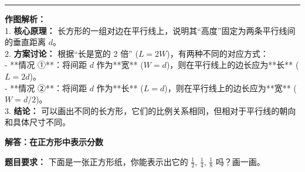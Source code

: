 \vspace{1.0cm}
\hrule
\vspace{0.4cm}

{\small
\textbf{作图解析：} \\
1. \textbf{核心原理：} 长方形的一组对边在平行线上，说明其“高度”固定为两条平行线间的垂直距离 $d$。 \\
2. \textbf{方案讨论：} 根据“长是宽的 2 倍” ($L = 2W$)，有两种不同的对应方式： \\
   - **情况 ①**：将间距 $d$ 作为**宽** ($W=d$)，则在平行线上的边长应为**长** ($L=2d$)。 \\
   - **情况 ②**：将间距 $d$ 作为**长** ($L=d$)，则在平行线上的边长应为**宽** ($W=d/2$)。 \\
3. \textbf{结论：} 可以画出不同的长方形，它们的比例关系相同，但相对于平行线的朝向和具体尺寸不同。
}




\newpage

\begin{center}
  {\large\bfseries 解答：在正方形中表示分数}
\end{center}

\vspace{0.6cm}

\noindent
{\small \textbf{题目要求：} 下面是一张正方形纸，你能表示出它的 $\frac{1}{2}$, $\frac{1}{4}$, $\frac{1}{8}$ 吗？画一画。}

\vspace{1.0cm}

